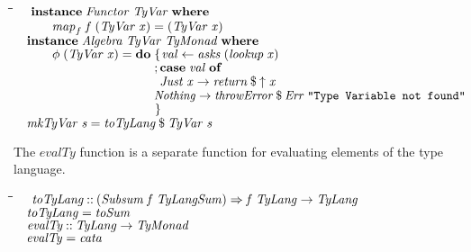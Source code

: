 \documentclass[10pt]{article}
\newlength{\lwidth}\setlength{\lwidth}{4.5cm}
\newlength{\cwidth}\setlength{\cwidth}{8mm} %
\newcommand{\Conid}[1]{\mathit{#1}}
\newcommand{\Varid}[1]{\mathit{#1}}
\begin{document}
\begin{tabbing}
\qquad\=\hspace{\lwidth}\=\hspace{\cwidth}\=\+\kill
${\hskip1.00em\relax\mathbf{instance}\;\Conid{Functor}\;\Conid{TyVar}\;\mathbf{where}}$\\
${\hskip1.00em\relax\hskip2.00em\relax\Varid{map}_{f}\;\Varid{f}\;(\Conid{TyVar}\;\Varid{x})\mathrel{=}(\Conid{TyVar}\;\Varid{x})}$\\
${}$\\
${\hskip1.00em\relax\mathbf{instance}\;\Conid{Algebra}\;\Conid{TyVar}\;\Conid{TyMonad}\;\mathbf{where}}$\\
${\hskip1.00em\relax\hskip2.00em\relax\Varid{\phi}\;(\Conid{TyVar}\;\Varid{x})\mathrel{=}\mathbf{do}\;\{\mskip1.5mu \Varid{val}\leftarrow \Varid{asks}\;(\Varid{lookup}\;\Varid{x})}$\\
${\hskip1.00em\relax\hskip2.00em\relax\phantom{\Varid{\phi}\;(\Conid{TyVar}\;\Varid{x})\mathrel{=}\mathbf{do}\;\mbox{}};\mathbf{case}\;\Varid{val}\;\mathbf{of}}$\\
${\hskip1.00em\relax\hskip2.00em\relax\phantom{\Varid{\phi}\;(\Conid{TyVar}\;\Varid{x})\mathrel{=}\mathbf{do}\;\mbox{}}\phantom{;\mbox{}}\Conid{Just}\;\Varid{x}\to \Varid{return}\mathbin{\$}\Varid{\uparrow}\;\Varid{x}}$\\
${\hskip1.00em\relax\hskip2.00em\relax\phantom{\Varid{\phi}\;(\Conid{TyVar}\;\Varid{x})\mathrel{=}\mathbf{do}\;\mbox{}}\phantom{;\mbox{}}\Conid{Nothing}\to \Varid{throwError}\mathbin{\$}\Conid{Err}\;\text{\tt \char34 Type~Variable~not~found\char34}}$\\
${\hskip1.00em\relax\hskip2.00em\relax\phantom{\Varid{\phi}\;(\Conid{TyVar}\;\Varid{x})\mathrel{=}\mathbf{do}\;\mbox{}}\mskip1.5mu\}}$\\
${}$\\
${\hskip1.00em\relax\Varid{mkTyVar}\;\Varid{s}\mathrel{=}\Varid{toTyLang}\mathbin{\$}\Conid{TyVar}\;\Varid{s}}$
\end{tabbing}
The \ensuremath{\Varid{evalTy}} function is a separate function for evaluating elements
of the type language.

\begin{tabbing}
\qquad\=\hspace{\lwidth}\=\hspace{\cwidth}\=\+\kill
${\hskip1.00em\relax\Varid{toTyLang}\mathbin{::}(\Conid{Subsum}\;\Varid{f}\;\Conid{TyLangSum})\Rightarrow \Varid{f}\;\Conid{TyLang}\to \Conid{TyLang}}$\\
${\hskip1.00em\relax\Varid{toTyLang}\mathrel{=}\Varid{toSum}}$\\
${}$\\
${\hskip1.00em\relax\Varid{evalTy}\mathbin{::}\Conid{TyLang}\to \Conid{TyMonad}}$\\
${\hskip1.00em\relax\Varid{evalTy}\mathrel{=}\Varid{cata}}$
\end{tabbing}
\end{document}
